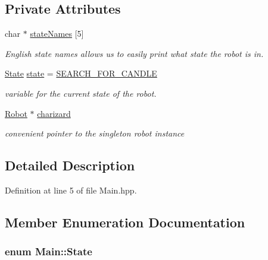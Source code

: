 \subsection*{Private Attributes}
\begin{DoxyCompactItemize}
\item 
char $\ast$ \hyperlink{classMain_a10090d1fa7fa606c1bf7c5bdf23d7eda}{state\-Names} \mbox{[}5\mbox{]}
\begin{DoxyCompactList}\small\item\em English state names allows us to easily print what state the robot is in. \end{DoxyCompactList}\item 
\hyperlink{classMain_a551231243a758b95cf29d8ed2b7508da}{State} \hyperlink{classMain_a8b4ada43c3c3720b177018191ac6ee90}{state} = \hyperlink{classMain_a551231243a758b95cf29d8ed2b7508daa9229c9e5dce20fda7fd5bbd54799fb32}{S\-E\-A\-R\-C\-H\-\_\-\-F\-O\-R\-\_\-\-C\-A\-N\-D\-L\-E}
\begin{DoxyCompactList}\small\item\em variable for the current state of the robot. \end{DoxyCompactList}\item 
\hyperlink{classRobot}{Robot} $\ast$ \hyperlink{classMain_a6b8534d72e39e2b43c3d46f2ca6e49f4}{charizard}
\begin{DoxyCompactList}\small\item\em convenient pointer to the singleton robot instance \end{DoxyCompactList}\end{DoxyCompactItemize}


\subsection{Detailed Description}


Definition at line 5 of file Main.\-hpp.



\subsection{Member Enumeration Documentation}
\hypertarget{classMain_a551231243a758b95cf29d8ed2b7508da}{
\subsubsection[{State}]{\setlength{\rightskip}{0pt plus 5cm}enum {\bf Main\-::\-State}\hspace{0.3cm}{\ttfamily [private]}}}\label{classMain_a551231243a758b95cf29d8ed2b7508da}


